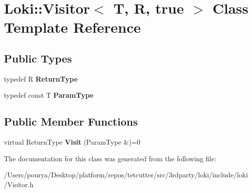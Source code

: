 \hypertarget{classLoki_1_1Visitor_3_01T_00_01R_00_01true_01_4}{}\section{Loki\+:\+:Visitor$<$ T, R, true $>$ Class Template Reference}
\label{classLoki_1_1Visitor_3_01T_00_01R_00_01true_01_4}
\subsection*{Public Types}
\begin{DoxyCompactItemize}
\item 
\hypertarget{classLoki_1_1Visitor_3_01T_00_01R_00_01true_01_4_a5a80a068c5852a5cf191e92d8c4ff2f0}{}typedef R {\bfseries Return\+Type}\label{classLoki_1_1Visitor_3_01T_00_01R_00_01true_01_4_a5a80a068c5852a5cf191e92d8c4ff2f0}

\item 
\hypertarget{classLoki_1_1Visitor_3_01T_00_01R_00_01true_01_4_a81757ae30f588839bfca513c58a4d867}{}typedef const T {\bfseries Param\+Type}\label{classLoki_1_1Visitor_3_01T_00_01R_00_01true_01_4_a81757ae30f588839bfca513c58a4d867}

\end{DoxyCompactItemize}
\subsection*{Public Member Functions}
\begin{DoxyCompactItemize}
\item 
\hypertarget{classLoki_1_1Visitor_3_01T_00_01R_00_01true_01_4_ab6b042939f99708d79d252131e91e0f0}{}virtual Return\+Type {\bfseries Visit} (Param\+Type \&)=0\label{classLoki_1_1Visitor_3_01T_00_01R_00_01true_01_4_ab6b042939f99708d79d252131e91e0f0}

\end{DoxyCompactItemize}


The documentation for this class was generated from the following file\+:\begin{DoxyCompactItemize}
\item 
/\+Users/pourya/\+Desktop/platform/repos/tetcutter/src/3rdparty/loki/include/loki/Visitor.\+h\end{DoxyCompactItemize}
